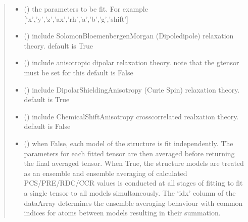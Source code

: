 \documentclass[a4paper,10pt,english,openany,oneside]{sphinxmanual}
\begin{document}
\begin{fulllineitems}
\begin{quote}
\begin{description}
\begin{itemize}
\item {} 
\sphinxAtStartPar
{} () \textendash{} the parameters to be fit.
For example {[}‘x’,’y’,’z’,’ax’,’rh’,’a’,’b’,’g’,’shift’{]}

\item {} 
\sphinxAtStartPar
{} (\sphinxstyleliteralemphasis{\sphinxupquote{, }}) \textendash{} include Solomon\sphinxhyphen{}Bloemenbergen\sphinxhyphen{}Morgan (Dipole\sphinxhyphen{}dipole) relaxation theory.
default is True

\item {} 
\sphinxAtStartPar
{} (\sphinxstyleliteralemphasis{\sphinxupquote{, }}) \textendash{} include anisotropic dipolar relaxation theory.
note that the g\sphinxhyphen{}tensor must be set for this
default is False

\item {} 
\sphinxAtStartPar
{} (\sphinxstyleliteralemphasis{\sphinxupquote{, }}) \textendash{} include Dipolar\sphinxhyphen{}Shielding\sphinxhyphen{}Anisotropy (Curie Spin) relaxation theory.
default is True

\item {} 
\sphinxAtStartPar
{} (\sphinxstyleliteralemphasis{\sphinxupquote{, }}) \textendash{} include Chemical\sphinxhyphen{}Shift\sphinxhyphen{}Anisotropy cross\sphinxhyphen{}correlated realxation theory.
default is False

\item {} 
\sphinxAtStartPar
{} (\sphinxstyleliteralemphasis{\sphinxupquote{, }}) \textendash{} when False, each model of the structure is fit independently.
The parameters for each fitted tensor are then averaged before
returning the final averaged tensor.
When True, the structure models are treated as an ensemble and
ensemble averaging of calculated PCS/PRE/RDC/CCR values is
conducted at all stages of fitting to fit a single tensor to all
models simultaneously. The ‘idx’ column of the dataArray
determines the ensemble averaging behaviour with common indices
for atoms between models resulting in their summation.


\end{itemize}
\end{description}
\end{quote}
\end{fulllineitems}
\end{document}
